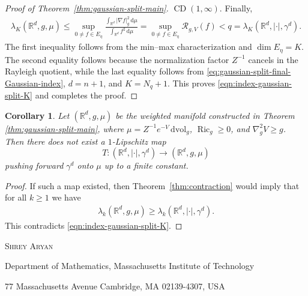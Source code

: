 \documentclass[11pt,reqno]{amsart}
\numberwithin{equation}{section}
\newtheorem{cor}[thm]{Corollary}
\theoremstyle{definition}
\theoremstyle{remark}
\def\cR {\mathcal{R}}
\newcommand{\R}{\mathbb{R}}
\newcommand{\lam}{\lambda}
\newcommand{\ud}{\mathrm{d}}
\newcommand{\0}{\emptyset}
\newcommand{\bbR}{\mathbb R}
\newcommand{\Ric}{\operatorname{Ric}}
\newcommand{\dvol}{\,\mathrm{dvol}}
\newcommand{\CD}{\operatorname{CD}}
\begin{document}
\begin{proof}[Proof of Theorem~\ref{thm:gaussian-split-main}]
$\CD(1,\infty)$. Finally,
\begin{align}
        \lam_K(\bbR^d,g,\mu)
        \leq
        \sup_{0\neq f\in E_\eta}
        \frac{
        \int_{\bbR^d}|\nabla f|_g^2\,\ud\mu
        }{
        \int_{\bbR^d}f^2\,\ud\mu
        }
        =
        \sup_{0\neq f\in E_\eta}
        \cR_{g,V}(f)
        <
        q
        =
        \lam_K(\bbR^d,|\cdot|,\gamma^d).
\end{align}
The first inequality follows from the min--max characterization and
$\dim E_\eta=K$. The second equality follows because the normalization factor
$Z^{-1}$ cancels in the Rayleigh quotient, while the last equality follows
from \eqref{eq:gaussian-split-final-Gaussian-index}, $d=n+1$, and
$K=N_q+1$. This proves \eqref{eqn:index-gaussian-split-K} and completes the
proof.
\end{proof}
\begin{cor}\label{cor:gaussian-split-main}
Let $(\R^d,g,\mu)$ be the weighted manifold constructed in Theorem
\ref{thm:gaussian-split-main}, where
$\mu=Z^{-1}e^{-V}\dvol_g$, $\Ric_g\geq0$, and
$\nabla_g^2V\geq g$. Then there does not exist a $1$-Lipschitz map
\[
        T:(\R^d,|\cdot|,\gamma^d)\to(\R^d,g,\mu)
\]
pushing forward $\gamma^d$ onto $\mu$ up to a finite constant.
\end{cor}

\begin{proof}
If such a map existed, then Theorem~\ref{thm:contraction} would imply that
for all $k\geq1$ we have
\begin{align}
        \lam_k(\R^d,g,\mu)
        \geq
        \lam_k(\R^d,|\cdot|,\gamma^d).
\end{align}
This contradicts \eqref{eqn:index-gaussian-split-K}.
\end{proof}



\bigskip
\centerline{\scshape Shrey Aryan}
\smallskip
{\footnotesize
 \centerline{Department of Mathematics, Massachusetts Institute of Technology}
\centerline{77 Massachusetts Avenue
Cambridge, MA 02139-4307, USA}
\centerline{}
} 
\end{document}
